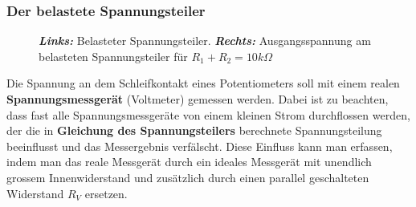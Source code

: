 \subsubsection{Der belastete Spannungsteiler}
\begin{figure}[H]
\centering
\caption{\textbf{\textit{Links:}} Belasteter Spannungsteiler. \textbf{\textit{Rechts:}} Ausgangsspannung am belasteten Spannungsteiler für $R_1+R_2=10k\Omega$}
\label{fig_IIIo}
\end{figure}
\noindent Die Spannung an dem Schleifkontakt eines Potentiometers soll mit einem realen \textbf{Spannungsmessgerät} (Voltmeter) gemessen werden. Dabei ist zu beachten, dass fast alle Spannungsmessgeräte von einem kleinen Strom durchflossen werden, der die in \textbf{Gleichung des Spannungsteilers} berechnete Spannungsteilung beeinflusst und das Messergebnis verfälscht. Diese Einfluss kann man erfassen, indem man das reale Messgerät durch ein ideales Messgerät mit unendlich grossem Innenwiderstand und zusätzlich durch einen parallel geschalteten Widerstand $R_V$ ersetzen.

